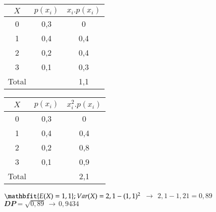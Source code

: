 \begin{enumerate}
\begin{enumerate}[label=\alph*)]
{			\begin{center}
				\begin{tabular}{cc|c|}
					\hline
					\multicolumn{1}{|c|}{$X$}	     & $p(x_{i})$	              	      & $x_{i}.p(x_{i})$                   \\ \hline
					\multicolumn{1}{|c|}{0}         & 0,3                          	      & 0                        \\ \hline
					\multicolumn{1}{|c|}{1}         & 0,4                     	      & 0,4                      \\ \hline
					\multicolumn{1}{|c|}{2}         & 0,2                      	      & 0,4                      \\ \hline
					\multicolumn{1}{|c|}{3}         & \multicolumn{1}{c|}{0,1} & \multicolumn{1}{c|}{0,3} \\ \hline
					\multicolumn{1}{|c}{Total}    & \multicolumn{1}{c|}{}       & \multicolumn{1}{c|}{1,1}    \\ \hline
				\end{tabular}
				\hfil
				\begin{tabular}{cc|c|}
					\hline
					\multicolumn{1}{|c|}{$X$}	     & $p(x_{i})$	              	      & $x_{i}^{2}.p(x_{i})$                   \\ \hline
					\multicolumn{1}{|c|}{0}         & 0,3                          	      & 0                        \\ \hline
					\multicolumn{1}{|c|}{1}         & 0,4                     	      & 0,4                      \\ \hline
					\multicolumn{1}{|c|}{2}         & 0,2                      	      & 0,8                      \\ \hline
					\multicolumn{1}{|c|}{3}         & \multicolumn{1}{c|}{0,1} & \multicolumn{1}{c|}{0,9} \\ \hline
					\multicolumn{1}{|c}{Total}    & \multicolumn{1}{c|}{}       & \multicolumn{1}{c|}{2,1}    \\ \hline
				\end{tabular}
			\end{center}

			${\mathbfit{E(X) = 1,1}};\\ Var(X) = 2,1 - (1,1)^{2}\ $$\, \to\,$$\ 2,1 - 1,21 = 0,89$	\\
			${\mathbfit{DP = \sqrt{0,89} \, \to\, 0,9434}}$	
		}
		
	\end{enumerate}

	\solv{}


\end{enumerate}
